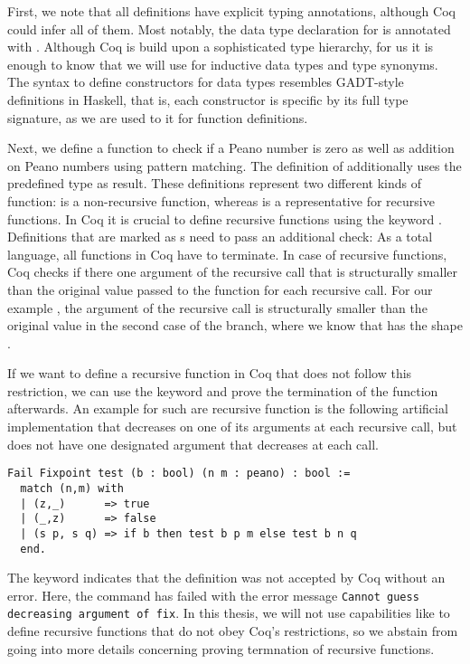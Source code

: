 First, we note that all definitions have explicit typing annotations, although Coq could infer all of them.
Most notably, the data type declaration for  is annotated with .
Although Coq is build upon a sophisticated type hierarchy, for us it is enough to know that we will use  for inductive data types and type synonyms.
The syntax to define constructors for data types resembles GADT-style definitions in Haskell, that is, each constructor is specific by its full type signature, as we are used to it for function definitions.

Next, we define a function to check if a Peano number is zero as well as addition on Peano numbers using pattern matching.
The definition of  additionally uses the predefined  type as result.
These definitions represent two different kinds of function:  is a non-recursive function, whereas  is a representative for recursive functions.
In Coq it is crucial to define recursive functions using the keyword .
Definitions that are marked as s need to pass an additional check: As a total language, all functions in Coq have to terminate.
In case of recursive functions, Coq checks if there one argument of the recursive call that is structurally smaller than the original value passed to the function for each recursive call.
For our example , the argument  of the recursive call is structurally smaller than the original value  in the second case of the branch, where we know that  has the shape .

If we want to define a recursive function in Coq that does not follow this restriction, we can use the keyword  and prove the termination of the function afterwards.
An example for such are recursive function is the following artificial implementation that decreases on one of its arguments at each recursive call, but does not have one designated argument that decreases at each call.

\begin{verbatim}
Fail Fixpoint test (b : bool) (n m : peano) : bool :=
  match (n,m) with
  | (z,_)      => true
  | (_,z)      => false
  | (s p, s q) => if b then test b p m else test b n q
  end.
\end{verbatim}

The keyword  indicates that the definition was not accepted by Coq without an error.
Here, the command has failed with the error message \texttt{Cannot guess decreasing argument of fix}.
In this thesis, we will not use capabilities like  to define recursive functions that do not obey Coq's restrictions, so we abstain from going into more details concerning proving termnation of recursive functions.


